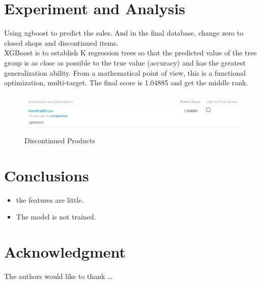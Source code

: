 \section{Experiment and Analysis} \label{sec-experiment}
Using xgboost to predict the sales. And in the final database, change zero to closed shops and discontinued items.\\
XGBoost is to establish K regression trees so that the predicted value of the tree group is as close as possible to the true value (accuracy) and has the greatest generalization ability. From a mathematical point of view, this is a functional optimization, multi-target.
The final score is 1.04885 and get the middle rank.
\begin{figure}[htb]
	\centering
	\includegraphics[width=12cm, height=2cm]{figures/rmse1.eps}
	\caption{Discontinued Products
	}\label{straddltimeScale}
\end{figure}
\section{Conclusions} \label{sec-conclusions}
\begin{itemize}
	\item the features are little.
	\item The model is not trained.
\end{itemize}

\section*{Acknowledgment}

\lipsum[1]


The authors would like to thank \ldots


